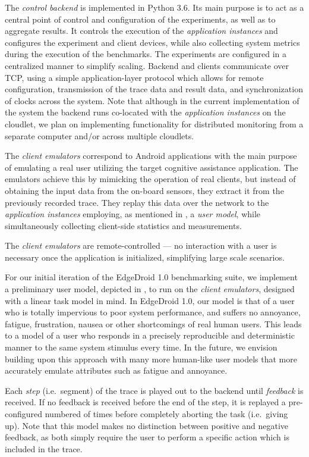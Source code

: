 The \emph{control backend} is implemented in Python 3.6.
Its main purpose is to act as a central point of control and configuration of the experiments, as well as to aggregate results.
It controls the execution of the \emph{application instances} and configures the experiment and client devices, while also collecting system metrics during the execution of the benchmarks.
The experiments are configured in a centralized manner to simplify scaling.
Backend and clients communicate over TCP, using a simple application-layer protocol which allows for remote configuration, transmission of the trace data and result data, and synchronization of clocks across the system.
Note that although in the current implementation of the system the backend runs co-located with the \emph{application instances} on the cloudlet, we plan on implementing functionality for distributed monitoring from a separate computer and/or across multiple cloudlets.

The \emph{client emulators} correspond to Android applications with the main purpose of emulating a real user utilizing the target cognitive assistance application.
The emulators achieve this by mimicking the operation of real clients, but instead of obtaining the input data from the on-board sensors, they extract it from the previously recorded trace.
They replay this data over the network to the \emph{application instances} employing, as mentioned in , a \emph{user model}, while simultaneously collecting client-side statistics and measurements.

The \emph{client emulators} are remote-controlled --- no interaction with a user is necessary once the application is initialized, simplifying large scale scenarios.

For our initial iteration of the EdgeDroid 1.0 benchmarking suite, we implement a preliminary user model, depicted in , to run on the \emph{client emulators}, designed with a linear task model in mind.
In EdgeDroid 1.0, our model is that of a user who is totally impervious to poor system performance, and suffers no annoyance, fatigue, frustration, nausea or other shortcomings of real human users.
This leads to a model of a user who responds in a precisely reproducible and deterministic manner to the same system stimulus every time.
In the future, we envision building upon this approach with many more human-like user models that more accurately emulate attributes such as fatigue and annoyance.

Each \emph{step} (i.e.\ segment) of the trace is played out to the backend until \emph{feedback} is received. If no feedback is received before the end of the step, it is replayed a pre-configured numbered of times before completely aborting the task (i.e.\ giving up).
Note that this model makes no distinction between positive and negative feedback, as both simply require the user to perform a specific action which is included in the trace.


